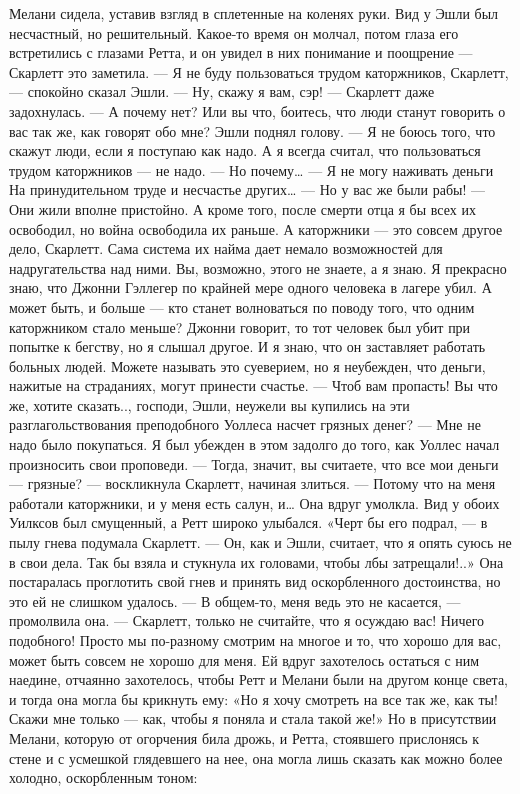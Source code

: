 Мелани сидела, уставив взгляд в сплетенные на коленях руки. Вид у Эшли был несчастный, но решительный. Какое-то время он молчал, потом глаза его встретились с глазами Ретта, и он увидел в них понимание и поощрение — Скарлетт это заметила.
— Я не буду пользоваться трудом каторжников, Скарлетт, — спокойно сказал Эшли.
— Ну, скажу я вам, сэр! — Скарлетт даже задохнулась. — А почему нет? Или вы что, боитесь, что люди станут говорить о вас так же, как говорят обо мне?
Эшли поднял голову.
— Я не боюсь того, что скажут люди, если я поступаю как надо. А я всегда считал, что пользоваться трудом каторжников — не надо.
— Но почему…
— Я не могу наживать деньги На принудительном труде и несчастье других…
— Но у вас же были рабы!
— Они жили вполне пристойно. А кроме того, после смерти отца я бы всех их освободил, но война освободила их раньше. А каторжники — это совсем другое дело, Скарлетт. Сама система их найма дает немало возможностей для надругательства над ними. Вы, возможно, этого не знаете, а я знаю. Я прекрасно знаю, что Джонни Гэллегер по крайней мере одного человека в лагере убил. А может быть, и больше — кто станет волноваться по поводу того, что одним каторжником стало меньше? Джонни говорит, то тот человек был убит при попытке к бегству, но я слышал другое. И я знаю, что он заставляет работать больных людей. Можете называть это суеверием, но я неубежден, что деньги, нажитые на страданиях, могут принести счастье.
— Чтоб вам пропасть! Вы что же, хотите сказать.., господи, Эшли, неужели вы купились на эти разглагольствования преподобного Уоллеса насчет грязных денег?
— Мне не надо было покупаться. Я был убежден в этом задолго до того, как Уоллес начал произносить свои проповеди.
— Тогда, значит, вы считаете, что все мои деньги — грязные? — воскликнула Скарлетт, начиная злиться. — Потому что на меня работали каторжники, и у меня есть салун, и…
Она вдруг умолкла. Вид у обоих Уилксов был смущенный, а Ретт широко улыбался. «Черт бы его подрал, — в пылу гнева подумала Скарлетт. — Он, как и Эшли, считает, что я опять суюсь не в свои дела. Так бы взяла и стукнула их головами, чтобы лбы затрещали!..» Она постаралась проглотить свой гнев и принять вид оскорбленного достоинства, но это ей не слишком удалось.
— В общем-то, меня ведь это не касается, — промолвила она.
— Скарлетт, только не считайте, что я осуждаю вас! Ничего подобного! Просто мы по-разному смотрим на многое и то, что хорошо для вас, может быть совсем не хорошо для меня.
Ей вдруг захотелось остаться с ним наедине, отчаянно захотелось, чтобы Ретт и Мелани были на другом конце света, и тогда она могла бы крикнуть ему: «Но я хочу смотреть на все так же, как ты! Скажи мне только — как, чтобы я поняла и стала такой же!» Но в присутствии Мелани, которую от огорчения била дрожь, и Ретта, стоявшего прислонясь к стене и с усмешкой глядевшего на нее, она могла лишь сказать как можно более холодно, оскорбленным тоном:
